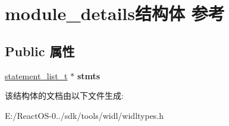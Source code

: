 \hypertarget{structmodule__details}{}\section{module\+\_\+details结构体 参考}
\label{structmodule__details}
\subsection*{Public 属性}
\begin{DoxyCompactItemize}
\item 
\mbox{\label{structmodule__details_ad76c9c7b5db00e5e2617d7f916c7349a}} 
\hyperlink{structstatement__list__t}{statement\+\_\+list\+\_\+t} $\ast$ {\bfseries stmts}
\end{DoxyCompactItemize}


该结构体的文档由以下文件生成\+:\begin{DoxyCompactItemize}
\item 
E\+:/\+React\+O\+S-\/0../sdk/tools/widl/widltypes.\+h\end{DoxyCompactItemize}
